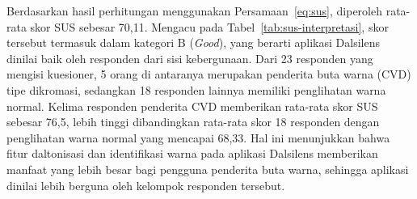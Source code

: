 Berdasarkan hasil perhitungan menggunakan Persamaan~\ref{eq:sus}, diperoleh rata-rata skor SUS sebesar 70,11.
Mengacu pada Tabel~\ref{tab:sus-interpretasi}, skor tersebut termasuk dalam kategori B (\textit{Good}), yang berarti aplikasi Dalsilens dinilai baik oleh responden dari sisi kebergunaan.
Dari 23 responden yang mengisi kuesioner, 5 orang di antaranya merupakan penderita buta warna (CVD) tipe dikromasi, sedangkan 18 responden lainnya memiliki penglihatan warna normal.
Kelima responden penderita CVD memberikan rata-rata skor SUS sebesar 76,5, lebih tinggi dibandingkan rata-rata skor 18 responden dengan penglihatan warna normal yang mencapai 68,33.
Hal ini menunjukkan bahwa fitur daltonisasi dan identifikasi warna pada aplikasi Dalsilens memberikan manfaat yang lebih besar bagi pengguna penderita buta warna, sehingga aplikasi dinilai lebih berguna oleh kelompok responden tersebut.
